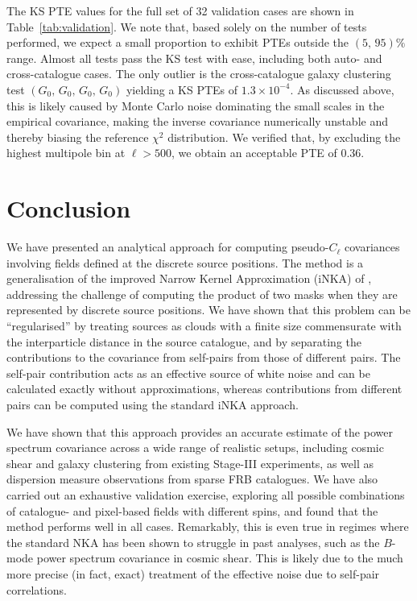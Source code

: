 \documentclass[%
 reprint,
superscriptaddress,
nofootinbib,
 amsmath,amssymb,
 aps,
 prd,
]{revtex4-2}
\begin{document}
    The KS PTE values for the full set of 32 validation cases are shown in Table~\ref{tab:validation}. We note that, based solely on the number of tests performed, we expect a small proportion to exhibit PTEs outside the $(5,\,95)\%$ range. Almost all tests pass the KS test with ease, including both auto- and cross-catalogue cases. The only outlier is the cross-catalogue galaxy clustering test $(G_0,\, G_0,\, G_0,\, G_0)$ yielding a KS PTEs of $1.3\times 10^{-4}$. As discussed above, this is likely caused by Monte Carlo noise dominating the small scales in the empirical covariance, making the inverse covariance numerically unstable and thereby biasing the reference $\chi^2$ distribution. We verified that, by excluding the highest multipole bin at $\ell>500$, we obtain an acceptable PTE of 0.36.

\section{Conclusion}\label{sec:conc}
  We have presented an analytical approach for computing pseudo-$C_\ell$ covariances involving fields defined at the discrete source positions. The method is a generalisation of the improved Narrow Kernel Approximation (iNKA) of \cite{1906.11765,2010.09717}, addressing the challenge of computing the product of two masks when they are represented by discrete source positions. We have shown that this problem can be ``regularised'' by treating sources as clouds with a finite size commensurate with the interparticle distance in the source catalogue, and by separating the contributions to the covariance from self-pairs from those of different pairs. The self-pair contribution acts as an effective source of white noise and can be calculated exactly without approximations, whereas contributions from different pairs can be computed using the standard iNKA approach.

  We have shown that this approach provides an accurate estimate of the power spectrum covariance across a wide range of realistic setups, including cosmic shear and galaxy clustering from existing Stage-III experiments, as well as dispersion measure observations from sparse FRB catalogues. We have also carried out an exhaustive validation exercise, exploring all possible combinations of catalogue- and pixel-based fields with different spins, and found that the method performs well in all cases. Remarkably, this is even true in regimes where the standard NKA has been shown to struggle in past analyses, such as the $B$-mode power spectrum covariance in cosmic shear. This is likely due to the much more precise (in fact, exact) treatment of the effective noise due to self-pair correlations.
\end{document}
